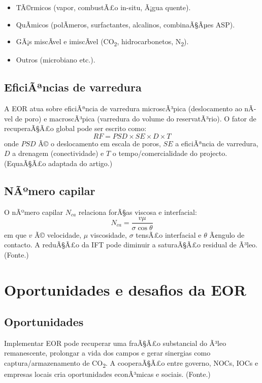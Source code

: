 \documentclass[11pt,a4paper]{article}
\begin{document}
\begin{itemize}[noitemsep]
  \item TÃ©rmicos (vapor, combustÃ£o in-situ, Ã¡gua quente).
  \item QuÃ­micos (polÃ­meros, surfactantes, alcalinos, combinaÃ§Ãµes ASP).
  \item GÃ¡s miscÃ­vel e imiscÃ­vel (CO\textsubscript{2}, hidrocarbonetos, N\textsubscript{2}).
  \item Outros (microbiano etc.).
\end{itemize}

\subsection{EficiÃªncias de varredura}
A EOR atua sobre eficiÃªncia de varredura microscÃ³pica (deslocamento ao nÃ­vel de poro) e macroscÃ³pica (varredura do volume do reservatÃ³rio). O fator de recuperaÃ§Ã£o global pode ser escrito como:
\begin{equation}
RF = PSD \times SE \times D \times T
\end{equation}
onde $PSD$ Ã© o deslocamento em escala de poros, $SE$ a eficiÃªncia de varredura, $D$ a drenagem (conectividade) e $T$ o tempo/comercialidade do projecto. (EquaÃ§Ã£o adaptada do artigo.)

\subsection{NÃºmero capilar}
O nÃºmero capilar $N_{ca}$ relaciona forÃ§as viscosa e interfacial:
\begin{equation}
N_{ca} = \frac{v \mu}{\sigma \cos\theta}
\end{equation}
em que $v$ Ã© velocidade, $\mu$ viscosidade, $\sigma$ tensÃ£o interfacial e $\theta$ Ã¢ngulo de contacto. A reduÃ§Ã£o da IFT pode diminuir a saturaÃ§Ã£o residual de Ã³leo. (Fonte.)

\section{Oportunidades e desafios da EOR}
\subsection{Oportunidades}
Implementar EOR pode recuperar uma fraÃ§Ã£o substancial do Ã³leo remanescente, prolongar a vida dos campos e gerar sinergias como captura/armazenamento de CO\textsubscript{2}. A cooperaÃ§Ã£o entre governo, NOCs, IOCs e empresas locais cria oportunidades econÃ³micas e sociais. (Fonte.)
\end{document}
